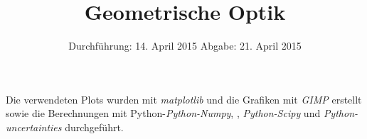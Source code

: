 
\subject{Anfängerpraktikum V408}
\title{Geometrische Optik}
\date{
  Durchführung: 14. April 2015
  \hspace{1em}
  Abgabe: 21. April 2015
}


\maketitle
\thispagestyle{empty}
\newpage





\newpage
\printbibliography
Die verwendeten Plots wurden mit \textit{matplotlib}\cite{matplotlib} und die Grafiken mit \textit{GIMP}\cite{gimp} erstellt sowie die Berechnungen mit Python-\textit{Python-Numpy}, \cite{numpy}, \textit{Python-Scipy}\cite{scipy} und \textit{Python-uncertainties}\cite{uncertainties} durchgeführt.

